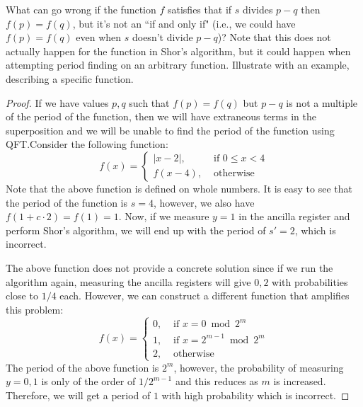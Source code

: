 \begin{solution}[label=ques:1b]
  \begin{question}
    What can go wrong if the function $f$
satisfies that if $s$ divides $p-q$ then $f(p)=f(q)$, but it's not an ``if and only if"
(i.e., we could have $f(p)=f(q)$ even when $s$ doesn't divide $p-q$)? Note that this does not actually happen for the function in Shor's algorithm, but it could happen when attempting period finding on an arbitrary function. Illustrate with an example, describing a specific function.
  \end{question}
  \tcblower{}
  \begin{proof}
    If we have values $p, q$ such that $f(p) = f(q)$ but $p - q$ is not a multiple of the period of the function, then we will have extraneous terms in the superposition and we will be unable to find the period of the function using QFT.\@ Consider the following function:
    \begin{equation}
      f(x) = \begin{cases}
        |x - 2|, &\text{ if }0 \leq x < 4\\
        f(x - 4), &\text{ otherwise}
      \end{cases}
      \label{eq:badfn}
    \end{equation}
    Note that the above function is defined on whole numbers. It is easy to see that the period of the function is $s = 4$, however, we also have $f(1 + c\cdot 2) = f(1) = 1$. Now, if we measure $y = 1$ in the ancilla register and perform Shor's algorithm, we will end up with the period of $s' = 2$, which is incorrect.\par
    The above function does not provide a concrete solution since if we run the algorithm again, measuring the ancilla registers will give $0, 2$ with probabilities close to $1/4$ each. However, we can construct a different function that amplifies this problem:
    \begin{equation}
      f(x) = \begin{cases}
        0, &\text{ if }x =  0 \bmod 2^m\\
        1, &\text{ if }x =  2^{m-1} \bmod 2^m\\
        2, &\text{ otherwise}
      \end{cases}
      \label{eq:badfn}
    \end{equation}
    The period of the above function is $2^m$, however, the probability of measuring $y = 0, 1$ is only of the order of $1/2^{m-1}$ and this reduces as $m$ is increased. Therefore, we will get a period of $1$ with high probability which is incorrect.
  \end{proof}
\end{solution}

